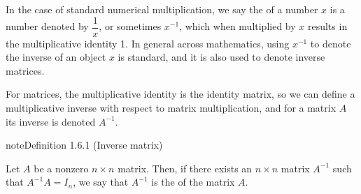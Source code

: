 \documentclass[letterpaper,10pt,english]{jupyterBook}
\begin{document}
\sphinxAtStartPar
In the case of standard numerical multiplication, we say the {\hyperref[\detokenize{_pages/0.3_Mathematical_preliminaries:axioms-of-addition-and-multiplication-section}]{}} of a number \(x\) is a number denoted by \(\dfrac{1}{x}\), or sometimes \(x^{-1}\), which when multiplied by \(x\) results in the multiplicative identity 1. In general across mathematics, using \(x^{-1}\) to denote the inverse of an object \(x\) is standard, and it is also used to denote inverse matrices.

\sphinxAtStartPar
For matrices, the multiplicative identity is the identity matrix, so we can define a multiplicative inverse with respect to matrix multiplication, and for a matrix \(A\) its inverse is denoted \(A^{-1}\).
\label{_pages/1.5_Inverse_matrix:inverse-matrix-definition}
\begin{sphinxadmonition}{note}{Definition 1.6.1 (Inverse matrix)}



\sphinxAtStartPar
Let \(A\) be a non\sphinxhyphen{}zero \(n \times n\) matrix. Then, if there exists an \(n \times n\) matrix \(A^{-1}\) such that \(A^{-1}A = I_n\), we say that \(A^{-1}\) is the  of the matrix \(A\).
\end{sphinxadmonition}
\end{document}
